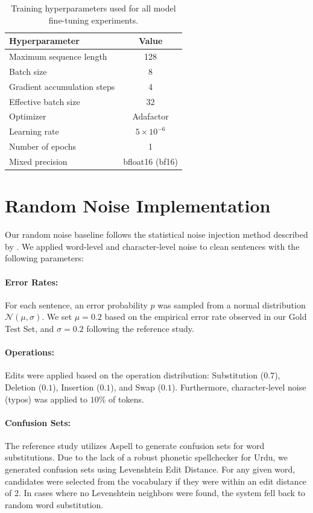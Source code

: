 \documentclass[11pt]{article}
\begin{document}
\begin{appendices}
\begin{table}[h]
\centering
\small
\setlength{\tabcolsep}{6pt}
\begin{tabular}{l c}
\hline
\textbf{Hyperparameter} & \textbf{Value} \\
\hline
Maximum sequence length & 128 \\
Batch size & 8 \\
Gradient accumulation steps & 4 \\
Effective batch size & 32 \\
Optimizer & Adafactor \\
Learning rate & $5 \times 10^{-6}$ \\
Number of epochs & 1 \\
Mixed precision & bfloat16 (bf16) \\
\hline
\end{tabular}
\caption{Training hyperparameters used for all model fine-tuning experiments.}
\label{tab:training_hyperparameters}
\end{table}

\section{Random Noise Implementation}
\label{sec:random_noise}
Our random noise baseline follows the statistical noise injection method described by \citet{grundkiewicz-etal-2019-neural}. We applied word-level and character-level noise to clean sentences with the following parameters:

\paragraph{Error Rates:} For each sentence, an error probability $p$ was sampled from a normal distribution $\mathcal{N}(\mu, \sigma)$. We set $\mu = 0.2$ based on the empirical error rate observed in our Gold Test Set, and $\sigma = 0.2$ following the reference study.

\paragraph{Operations:} Edits were applied based on the operation distribution: Substitution ($0.7$), Deletion ($0.1$), Insertion ($0.1$), and Swap ($0.1$). Furthermore, character-level noise (typos) was applied to $10\%$ of tokens.

\paragraph{Confusion Sets:} The reference study utilizes Aspell to generate confusion sets for word substitutions. Due to the lack of a robust phonetic spellchecker for Urdu, we generated confusion sets using Levenshtein Edit Distance. For any given word, candidates were selected from the vocabulary if they were within an edit distance of 2. In cases where no Levenshtein neighbors were found, the system fell back to random word substitution.


\end{appendices}
\end{document}
